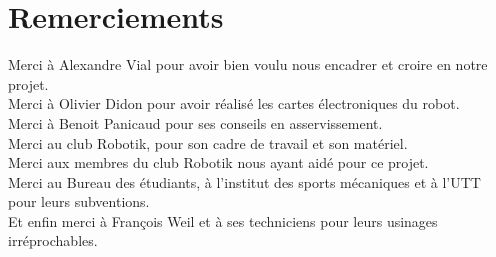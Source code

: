 \chapter*{Remerciements}
    \noindent
    Merci à Alexandre Vial pour avoir bien voulu nous encadrer et croire en notre projet.\\
    Merci à Olivier Didon pour avoir réalisé les cartes électroniques du robot.\\
    Merci à Benoit Panicaud pour ses conseils en asservissement.\\
    Merci au club Robotik, pour son cadre de travail et son matériel.\\
    Merci aux membres du club Robotik nous ayant aidé pour ce projet.\\
    Merci au Bureau des étudiants, à l'institut des sports mécaniques et à l'UTT pour leurs subventions.\\
    Et enfin merci à François Weil et à ses techniciens pour leurs usinages irréprochables.\\\\

